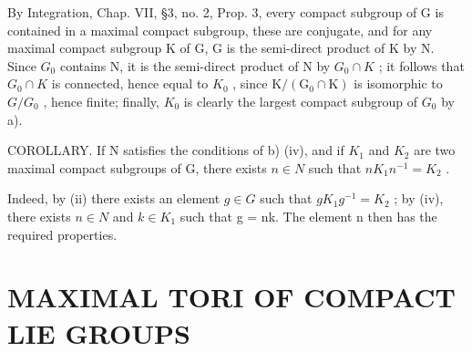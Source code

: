 By Integration, Chap. VII, §3, no. 2, Prop. 3, every compact subgroup of G is contained in a maximal compact subgroup, these are conjugate, and for any maximal compact subgroup K of G, G is the semi-direct product of K by N. Since \(G_{0}\) contains N, it is the semi-direct product of N by \(G_{0} \cap K\) ; it follows that \(G_{0} \cap K\) is connected, hence equal to \(K_{0}\) , since \(\mathrm{K}/(\mathrm{G}_{0} \cap \mathrm{K})\) is isomorphic to \(G/G_{0}\) , hence finite; finally, \(K_{0}\) is clearly the largest compact subgroup of \(G_{0}\) by a).

COROLLARY. If N satisfies the conditions of b) (iv), and if \(K_{1}\) and \(K_{2}\) are two maximal compact subgroups of G, there exists \(n \in N\) such that \(nK_{1}n^{-1} = K_{2}\) .

Indeed, by (ii) there exists an element \(g \in G\) such that \(gK_{1}g^{-1} = K_{2}\) ; by (iv), there exists \(n \in N\) and \(k \in K_{1}\) such that g = nk. The element n then has the required properties.

\section{MAXIMAL TORI OF COMPACT LIE GROUPS}